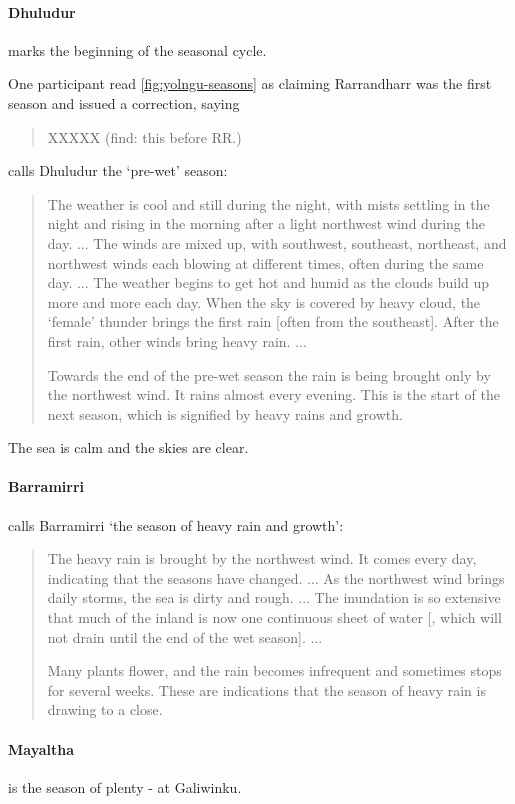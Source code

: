 \paragraph{Dhuludur} marks the beginning of the seasonal cycle.

One participant read \autoref{fig:yolngu-seasons} as claiming Rarrandharr was the first season
and issued a correction, saying \blockquote{XXXXX (find: this before RR.)}.

\citet{davis1989} calls Dhuludur the `pre-wet' season:
\blockquote{
    The weather is cool and still during the night, with mists settling in the night
    and rising in the morning after a light northwest wind during the day. ...
    The winds are mixed up, with southwest, southeast, northeast, and northwest winds
    each blowing at different times, often during the same day. ...
    The weather begins to get hot and humid as the clouds build up more and more each day.
    When the sky is covered by heavy cloud, the `female' thunder brings the first rain [often from the southeast].
    After the first rain, other winds bring heavy rain. ...
    
    Towards the end of the pre-wet season the rain is being brought only by the northwest wind.
    It rains almost every evening.
    This is the start of the next season, which is signified by heavy rains and growth.
}

The sea is calm and the skies are clear.


\paragraph{Barramirri}

\citet{davis1989} calls Barramirri `the season of heavy rain and growth':
\blockquote{
    The heavy rain is brought by the northwest wind. It comes every day,
    indicating that the seasons have changed. ...
    As the northwest wind brings daily storms, the sea is dirty and rough. ...
    The inundation is so extensive that much of the inland is now one continuous sheet of water
    [, which will not drain until the end of the wet season]. ...
    
    Many plants flower, and the rain becomes infrequent and sometimes stops for several weeks.
    These are indications that the season of heavy rain is drawing to a close.
}


\paragraph{Mayaltha} is the season of plenty - at Galiwinku.  

